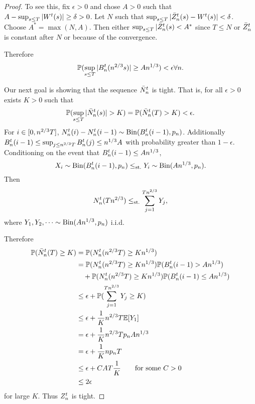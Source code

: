 \begin{proof}
To see this, fix $\epsilon > 0$ and chose $A>0$ such that $A - \sup_{s\leq T} |W^t(s)| \geq \delta > 0$.
Let $N$ such that $\sup_{s\leq T} |\bar{Z}^t_n(s) - W^t(s)| < \delta$.
Choose $A^* = \max(N, A)$. Then either $\sup_{s\leq T} |\bar{Z}^t_n(s) < A^*$ since $T \leq N$ or $\bar{Z}^t_n$ is constant after $N$ or because of the convergence.

Therefore
\begin{equation}
\mathbb{P}( \sup_{s \leq T} |B_n^t(n^{2 / 3}s)| \geq An^{1 / 3} ) < \epsilon \forall n.
\end{equation}

Our next goal is showing that the sequence $\bar{N}_n^t$ is tight.
That is, for all $\epsilon > 0$ exists $K>0$ such that
\begin{equation}
\mathbb{P}(\sup_{s \leq T} |\bar{N}_n^t(s)| > K) = \mathbb{P}( \bar{N}_n^t(T) > K ) < \epsilon.
\end{equation}
For $i \in [0, n^{2 / 3}T]$, $N_n^t(i) - N_n^t(i-1) \sim \operatorname*{Bin}(B_n^t(i-1), p_n)$.
Additionally $B_n^t(i-1) \leq \sup_{j \leq n^{2 / 3}T} B_n^t(j) \leq n^{1 / 3}A$ with probability greater than $1-\epsilon$.
Conditioning on the event that $B_n^t(i-1) \leq An^{1 / 3}$,
\begin{equation}
X_i \sim \operatorname*{Bin}(B_n^t(i-1), p_n) \leq_{\text{st.}} Y_i \sim \operatorname*{Bin}(An^{1 / 3}, p_n).
\end{equation}
Then
\begin{equation}
N_n^t(Tn^{2 / 3}) \leq_{\text{st.}} \sum_{j=1}^{Tn^{2 / 3}} Y_j,
\end{equation}
where $Y_1, Y_2, \dots \sim \operatorname*{Bin}(An^{1 / 3}, p_n)$ i.i.d.

Therefore
\begin{align*}
\mathbb{P}(\bar{N}_n^t(T) \geq K) 
&= \mathbb{P}(N_n^t(n^{2 / 3}T) \geq Kn^{1 / 3}) \\
&= \mathbb{P}(N_n^t(n^{2 / 3}T) \geq Kn^{1 / 3}) \mathbb{P}(B_n^t(i-1) > An^{1 / 3}) \\
&\quad + \mathbb{P}(N_n^t(n^{2 / 3}T) \geq Kn^{1 / 3}) \mathbb{P}(B_n^t(i-1) \leq An^{1 / 3}) \\
&\leq \epsilon + \mathbb{P}( \sum_{j=1}^{Tn^{2 / 3}} Y_j \geq K) \\
&\leq \epsilon + \frac{1}{K}n^{2 / 3}T \mathbb{E}[Y_1] \\
&= \epsilon + \frac{1}{K}n^{2 / 3}T p_n An^{1 / 3} \\
&= \epsilon + \frac{1}{K}np_n T \\
&\leq \epsilon + CAT\frac{1}{K} \qquad \text{for some $C>0$} \\
&\leq 2\epsilon
\end{align*}
for large $K$.
Thus $Z_n^t$ is tight.


\end{proof}
